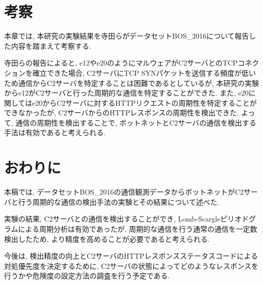 \documentclass[twocolumn,9pt]{ltjsarticle}
\begin{document}
\section{考察}
本章では, 本研究の実験結果を寺田らがデータセットBOS\_2016について報告した内容\cite{weko_175829_1}を踏まえて考察する. 

寺田らの報告によると, e12やe20のようにマルウェアがC2サーバとのTCPコネクションを確立できた場合, C2サーバにTCP SYNパケットを送信する頻度が低いため通信からC2サーバを特定することは困難であるとしているが, 本研究の実験からe12がC2サーバと行った周期的な通信を特定することができた. また, e20に関してはe20からC2サーバに対するHTTPリクエストの周期性を特定することができなかったが, C2サーバからのHTTPレスポンスの周期性を検出できた. よって, 通信の周期性を検出することで, ボットネットとC2サーバの通信を検出する手法は有効であると考えられる. 

\section{おわりに}
本稿では, データセットBOS\_2016の通信観測データからボットネットがC2サーバと行う周期的な通信の検出手法の実験とその結果について述べた. 

実験の結果, C2サーバとの通信を検出することができ, Lomb-Scargleピリオドグラムによる周期分析は有効であったが, 周期的な通信を行う通常の通信を一定数検出したため, より精度を高めることが必要であると考えられる. 

今後は, 検出精度の向上とC2サーバのHTTPレスポンスステータスコードによる対処優先度を決定するために, C2サーバの状態によってどのようなレスポンスを行うかや危険度の設定方法の調査を行う予定である. 



\end{document}
